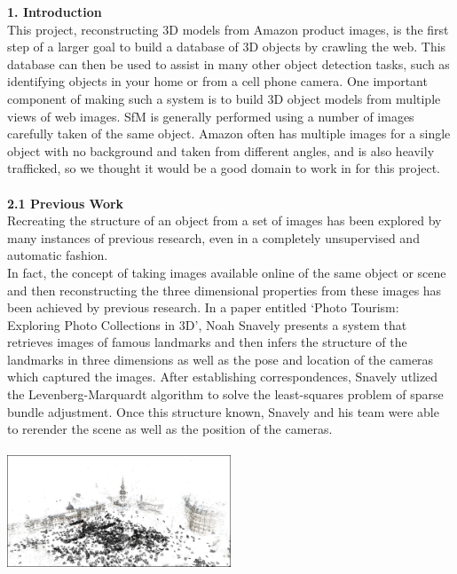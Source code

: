 \documentclass[12pt]{article}
\begin{document}
\begin{multicols}{2}
{\noindent \large \textbf{1. Introduction}}\\
This project, reconstructing 3D models from Amazon product images, is the first step of a larger goal to build a database of 3D objects by crawling the web.  This database can then be used to assist in many other object detection tasks, such as identifying objects in your home or from a cell phone camera.  One important component of making such a system is to build 3D object models from multiple views of web images. SfM is generally performed using a number of images carefully taken of the same object. Amazon often has multiple images for a single object with no background and taken from different angles, and is also heavily trafficked, so we thought it would be a good domain to work in for this project.
\\\\
{\large \textbf{2.1 Previous Work}}\\
Recreating the structure of an object from a set of images has been explored by many instances of previous research, even in a completely unsupervised and automatic fashion. \\
\indent In fact, the concept of taking images available online of the same object or scene and then reconstructing the three dimensional properties from these images has been achieved by previous research. In a paper entitled `Photo Tourism: Exploring Photo Collections in 3D', Noah Snavely presents a system that retrieves images of famous landmarks and then infers the structure of the landmarks in three dimensions as well as the pose and location of the cameras which captured the images. After establishing correspondences, Snavely utlized the Levenberg-Marquardt algorithm to solve the least-squares problem of sparse bundle adjustment. Once this structure known, Snavely and his team were able to rerender the scene as well as the position of the cameras. \\\\
\includegraphics[width=0.5\textwidth]{images/phototourism.png}\\\\

\end{multicols}
\end{document}
